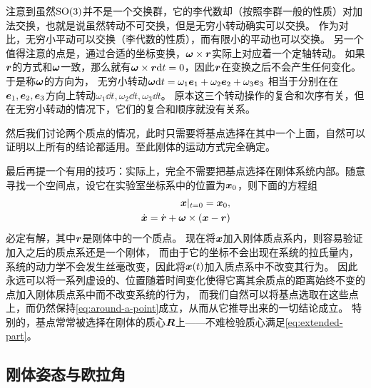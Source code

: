 注意到虽然$\mathrm{SO}(3)$并不是一个交换群，它的李代数却（按照李群一般的性质）对加法交换，也就是说虽然转动不可交换，但是无穷小转动确实可以交换。
作为对比，无穷小平动可以交换（李代数的性质），而有限小的平动也可以交换。
另一个值得注意的点是，通过合适的坐标变换，$\vb*{\omega} \times \vb*{r}$实际上对应着一个定轴转动。
如果$\vb*{r}$的方式和$\vb*{\omega}$一致，那么就有$\vb*{\omega}\times \vb*{r} \dd t =0$，因此$\vb*{r}$在变换之后不会产生任何变化。
于是称$\vb*{\omega}$的方向为，
无穷小转动$\vb*{\omega} \dd t = \omega_1 \vb*{e}_1 + \omega_2 \vb*{e}_2 + \omega_3 \vb*{e}_3$
相当于分别在在$\vb*{e}_1, \vb*{e}_2, \vb*{e}_3$方向上转动$\omega_1 \dd t, \omega_2 \dd t, \omega_3 \dd t$。
原本这三个转动操作的复合和次序有关，但在无穷小转动的情况下，它们的复合和顺序就没有关系。

然后我们讨论两个质点的情况，此时只需要将基点选择在其中一个上面，自然可以证明以上所有的结论都适用。至此刚体的运动方式完全确定。

最后再提一个有用的技巧：实际上，完全不需要把基点选择在刚体系统内部。随意寻找一个空间点，设它在实验室坐标系中的位置为$\vb*{x}_0$，则下面的方程组
\begin{equation}
    \begin{split}
        \vb*{x}|_{t=0} = \vb*{x}_0, \\
        \dot{\vb*{x}} = \dot{\vb*{r}} + \vb*{\omega} \times (\vb*{x} - \vb*{r})
    \end{split}
    \label{eq:extended-part}
\end{equation}
必定有解，其中$\vb*{r}$是刚体中的一个质点。
现在将$\vb*{x}$加入刚体质点系内，则容易验证加入之后的质点系还是一个刚体，
而由于它的坐标不会出现在系统的拉氏量内，系统的动力学不会发生丝毫改变，因此将$\vb*{x}(t)$加入质点系中不改变其行为。
因此永远可以将一系列虚设的、位置随着时间变化使得它离其余质点的距离始终不变的点加入刚体质点系中而不改变系统的行为，
而我们自然可以将基点选取在这些点上，而仍然保持\eqref{eq:around-a-point}成立，从而从它推导出来的一切结论成立。
特别的，基点常常被选择在刚体的质心$\vb*{R}$上——不难检验质心满足\eqref{eq:extended-part}。

\subsection{刚体姿态与欧拉角}\label{sec:euler-angle}

